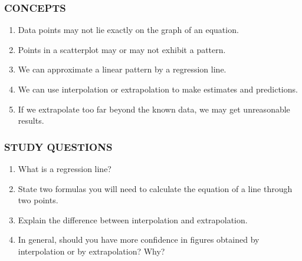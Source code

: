\documentclass[10pt,]{book}
\theoremstyle{plain}
\theoremstyle{definition}
\theoremstyle{definition}
\theoremstyle{definition}
\theoremstyle{definition}
\numberwithin{equation}{part}
\begin{document}
\subsubsection[{CONCEPTS}]{CONCEPTS}\label{subsubsection-22}
\leavevmode%
\begin{enumerate}[label=\arabic*]
\item\hypertarget{li-1344}{}Data points may not lie exactly on the graph of an equation.%
\item\hypertarget{li-1345}{}Points in a scatterplot may or may not exhibit a pattern.%
\item\hypertarget{li-1346}{}We can approximate a linear pattern by a regression line.%
\item\hypertarget{li-1347}{}We can use interpolation or extrapolation to make estimates and predictions.%
\item\hypertarget{li-1348}{}If we extrapolate too far beyond the known data, we may get unreasonable results.%
\end{enumerate}
%
\typeout{************************************************}
\typeout{************************************************}
\subsubsection[{STUDY QUESTIONS}]{STUDY QUESTIONS}\label{subsubsection-23}
\leavevmode%
\begin{enumerate}[label=\arabic*]
\item\hypertarget{li-1349}{}What is a regression line?%
\item\hypertarget{li-1350}{}State two formulas you will need to calculate the equation of a line through two points.%
\item\hypertarget{li-1351}{}Explain the difference between interpolation and extrapolation.%
\item\hypertarget{li-1352}{}In general, should you have more confidence in figures obtained by interpolation or by extrapolation? Why?%
\end{enumerate}
%
\typeout{************************************************}
\typeout{************************************************}
\end{document}
